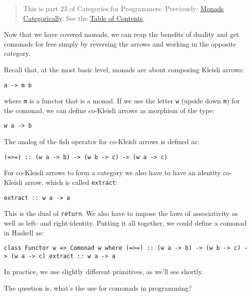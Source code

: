 \begin{quote}
This is part 23 of Categories for Programmers. Previously:
\href{https://bartoszmilewski.com/2016/12/27/monads-categorically/}{Monads
Categorically}. See the
\href{https://bartoszmilewski.com/2014/10/28/category-theory-for-programmers-the-preface/}{Table
of Contents}.
\end{quote}

Now that we have covered monads, we can reap the benefits of duality and
get comonads for free simply by reversing the arrows and working in the
opposite category.

Recall that, at the most basic level, monads are about composing Kleisli
arrows:

\begin{verbatim}
a -> m b
\end{verbatim}

where \texttt{m} is a functor that is a monad. If we use the letter
\texttt{w} (upside down \texttt{m}) for the comonad, we can define
co-Kleisli arrows as morphism of the type:

\begin{verbatim}
w a -> b
\end{verbatim}

The analog of the fish operator for co-Kleisli arrows is defined as:

\begin{verbatim}
(=>=) :: (w a -> b) -> (w b -> c) -> (w a -> c)
\end{verbatim}

For co-Kleisli arrows to form a category we also have to have an
identity co-Kleisli arrow, which is called \texttt{extract}:

\begin{verbatim}
extract :: w a -> a
\end{verbatim}

This is the dual of \texttt{return}. We also have to impose the laws of
associativity as well as left- and right-identity. Putting it all
together, we could define a comonad in Haskell as:

\begin{verbatim}
class Functor w => Comonad w where (=>=) :: (w a -> b) -> (w b -> c) -> (w a -> c) extract :: w a -> a
\end{verbatim}

In practice, we use slightly different primitives, as we'll see shortly.

The question is, what's the use for comonads in programming?

